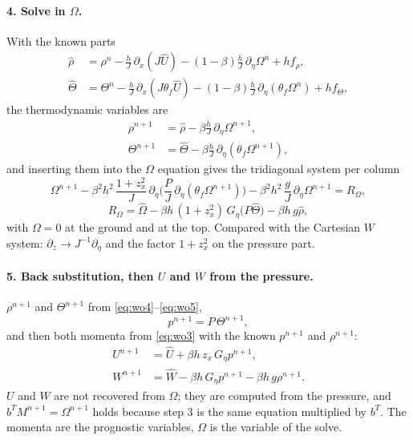 \documentclass[11pt,a4paper]{article}
\begin{document}
\paragraph{4. Solve in $\Omega$.} With the known parts
\begin{align*}
\hat\rho&=\rho^n-\frac hJ\,\partial_x(J\hat U)-(1-\beta)\frac hJ\,\partial_\eta\Omega^n+hf_\rho,\\
\hat\Theta&=\Theta^n-\frac hJ\,\partial_x(J\theta_f\hat U)-(1-\beta)\frac hJ\,\partial_\eta(\theta_f\Omega^n)+hf_\Theta,
\end{align*}
the thermodynamic variables are
\begin{align}
\rho^{n+1}&=\hat\rho-\beta\frac hJ\,\partial_\eta\Omega^{n+1},\label{eq:wo4}\\
\Theta^{n+1}&=\hat\Theta-\beta\frac hJ\,\partial_\eta(\theta_f\Omega^{n+1}),\label{eq:wo5}
\end{align}
and inserting them into the $\Omega$ equation gives the tridiagonal system per column
\[
\Omega^{n+1}-\beta^2h^2\,\frac{1+z_x^2}{J}\,\partial_\eta\Big(\frac PJ\,\partial_\eta(\theta_f\Omega^{n+1})\Big)-\beta^2h^2\,\frac gJ\,\partial_\eta\Omega^{n+1}=R_\Omega,
\]
\[
R_\Omega=\hat\Omega-\beta h\,(1+z_x^2)\,G_\eta\big(P\hat\Theta\big)-\beta h\,g\hat\rho ,
\]
with $\Omega=0$ at the ground and at the top. Compared with the Cartesian $W$ system: $\partial_z\to J^{-1}\partial_\eta$ and the
factor $1+z_x^2$ on the pressure part.

\paragraph{5. Back substitution, then $U$ and $W$ from the pressure.} $\rho^{n+1}$ and $\Theta^{n+1}$ from \eqref{eq:wo4}--\eqref{eq:wo5},
\[
p^{n+1}=P\,\Theta^{n+1},
\]
and then both momenta from \eqref{eq:wo3} with the known $p^{n+1}$ and $\rho^{n+1}$:
\begin{align*}
U^{n+1}&=\hat U+\beta h\,z_x\,G_\eta p^{n+1},\\
W^{n+1}&=\hat W-\beta h\,G_\eta p^{n+1}-\beta h\,g\rho^{n+1}.
\end{align*}
$U$ and $W$ are not recovered from $\Omega$; they are computed from the pressure, and $b^TM^{n+1}=\Omega^{n+1}$ holds
because step 3 is the same equation multiplied by $b^T$. The momenta are the prognostic variables, $\Omega$ is
the variable of the solve.
\end{document}
